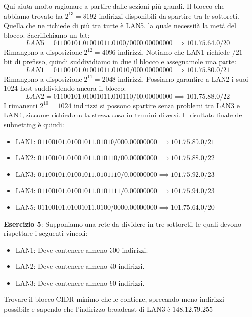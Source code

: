 \noindent Qui aiuta molto ragionare a partire dalle sezioni più grandi. Il blocco che abbiamo trovato ha $2^{13} = 8192$ indirizzi disponibili da
spartire tra le sottoreti. Quella che ne richiede di più tra tutte è LAN5, la quale necessità la metà del blocco. Sacrifichiamo un bit: \[
	LAN5 = 01100101.01001011.0100/0000.00000000 \implies 101.75.64.0/20
\]
\noindent Rimangono a disposizione $2^{12}=4096$ indirizzi. Notiamo che LAN1 richiede $/21$ bit di prefisso, quindi suddividiamo in due il blocco e
assegnamole una parte: \[
	LAN1 = 01100101.01001011.01010/000.00000000 \implies 101.75.80.0/21
\]
\noindent Rimangono a disposizione $2^{11}=2048$ indirizzi. Possiamo garantire a LAN2 i suoi $1024$ host suddividendo ancora il blocco: \[
	LAN2 = 01100101.01001011.010110/00.00000000 \implies 101.75.88.0/22
\]
\noindent I rimanenti $2^{10}=1024$ indirizzi si possono spartire senza problemi tra LAN3 e LAN4, siccome richiedono la stessa cosa in termini diversi.
Il risultato finale del subnetting è quindi: \begin{itemize}
	\item LAN1: $01100101.01001011.01010/000.00000000 \implies 101.75.80.0/21$ \checkmark
	\item LAN2: $01100101.01001011.010110/00.00000000 \implies 101.75.88.0/22$ \checkmark
	\item LAN3: $01100101.01001011.0101110/0.00000000 \implies 101.75.92.0/23$ \checkmark
	\item LAN4: $01100101.01001011.0101111/0.00000000 \implies 101.75.94.0/23$ \checkmark
	\item LAN5: $01100101.01001011.0100/0000.00000000 \implies 101.75.64.0/20$ \checkmark
\end{itemize}

\noindent \textbf{Esercizio 5}: Supponiamo una rete da dividere in tre sottoreti, le quali devono rispettare i seguenti vincoli: \begin{itemize}
	\item LAN1: Deve contenere almeno 300 indirizzi.
	\item LAN2: Deve contenere almeno 40 indirizzi.
	\item LAN3: Deve contenere almeno 90 indirizzi.
\end{itemize}
\noindent Trovare il blocco CIDR minimo che le contiene, sprecando meno indirizzi possibile e sapendo che l'indirizzo broadcast di LAN3 è 
$148.12.79.255$\newline

